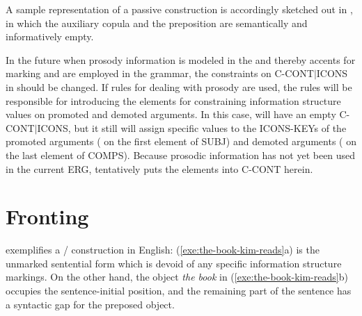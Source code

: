 \noindent A sample representation of a passive construction is
accordingly sketched out in , in
which the auxiliary copula \textit{} and the preposition
\textit{} are semantically and informatively empty.






In the future when prosody information is modeled in the  and
thereby accents for marking  and  are employed
in the grammar, the constraints on C-CONT{$\mid$}ICONS in
 should be changed. If rules for dealing with
prosody are used, the rules will be responsible for introducing the
 elements for constraining information structure values on
promoted and demoted arguments. In this case,
 will have an empty C-CONT{$\mid$}ICONS,
but it still will assign specific values to the ICONS-KEYs of the
promoted arguments ( on the first element of SUBJ)
and demoted arguments ( on the last element of
COMPS). Because prosodic information has not yet been used in the
current ERG, tentatively  puts the 
elements into C-CONT herein.



\section{Fronting}
\label{10:sec:fronting}



 exemplifies a /
 construction in English:
(\ref{exe:the-book-kim-reads}a) is the unmarked sentential form which
is devoid of any specific information structure markings. On the other
hand, the object \textit{the book} in (\ref{exe:the-book-kim-reads}b)
occupies the sentence-initial position, and the remaining part of the
sentence has a syntactic gap for the preposed object.




